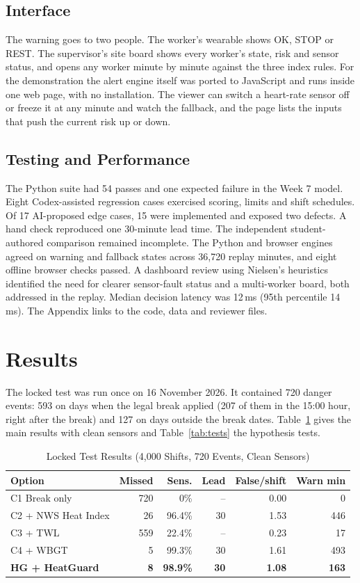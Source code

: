 \documentclass[conference,a4paper]{IEEEtran}
\begin{document}
\subsection{Interface}
The warning goes to two people. The worker's wearable shows OK, STOP or REST. The supervisor's site board shows every worker's state, risk and sensor status, and opens any worker minute by minute against the three index rules. For the demonstration the alert engine itself was ported to JavaScript and runs inside one web page, with no installation. The viewer can switch a heart-rate sensor off or freeze it at any minute and watch the fallback, and the page lists the inputs that push the current risk up or down.

\subsection{Testing and Performance}
The Python suite had 54 passes and one expected failure in the Week 7 model. Eight Codex-assisted regression cases exercised scoring, limits and shift schedules. Of 17 AI-proposed edge cases, 15 were implemented and exposed two defects. A hand check reproduced one 30-minute lead time. The independent student-authored comparison remained incomplete. The Python and browser engines agreed on warning and fallback states across 36,720 replay minutes, and eight offline browser checks passed. A dashboard review using Nielsen's heuristics \cite{nielsen} identified the need for clearer sensor-fault status and a multi-worker board, both addressed in the replay. Median decision latency was 12\,ms (95th percentile 14\,ms). The Appendix links to the code, data and reviewer files.

\section{Results}
The locked test was run once on 16 November 2026. It contained 720 danger events: 593 on days when the legal break applied (207 of them in the 15:00 hour, right after the break) and 127 on days outside the break dates. Table~\ref{tab:results} gives the main results with clean sensors and Table~\ref{tab:tests} the hypothesis tests.

\begin{table}[!t]
\caption{Locked Test Results (4,000 Shifts, 720 Events, Clean Sensors)}
\label{tab:results}
\centering
\footnotesize
\setlength{\tabcolsep}{3pt}
\begin{tabular}{@{}lrrrrr@{}}
\toprule
Option & Missed & Sens. & Lead & False/shift & Warn min \\
\midrule
C1 Break only & 720 & 0\% & -- & 0.00 & 0 \\
C2 + NWS Heat Index & 26 & 96.4\% & 30 & 1.53 & 446 \\
C3 + TWL & 559 & 22.4\% & -- & 0.23 & 17 \\
C4 + WBGT & 5 & 99.3\% & 30 & 1.61 & 493 \\
\textbf{HG + HeatGuard} & \textbf{8} & \textbf{98.9\%} & \textbf{30} & \textbf{1.08} & \textbf{163} \\
\bottomrule
\end{tabular}
\end{table}
\end{document}
